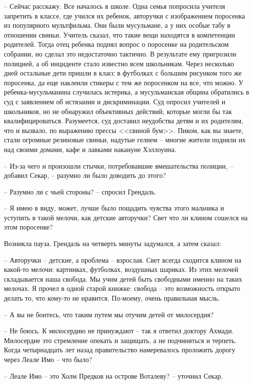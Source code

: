 -- Сейчас расскажу. Все началось в школе. Одна семья попросила учителя запретить в классе, где учился их ребенок, авторучки с изображением поросенка из популярного мультфильма. Они были мусульмане, а у них особые табу в отношении свиньи. Учитель сказал, что такие вещи находятся в компетенции родителей. Тогда отец ребенка поднял вопрос о поросенке на родительском собрании, но сделал это недостаточно тактично. В результате ему пригрозили полицией, а об инциденте стало известно всем школьникам. Через несколько дней остальные дети пришли в класс в футболках с большим рисунком того же поросенка, да еще наклеили стикеры с тем же поросенком на все, что можно. У ребенка-мусульманина случилась истерика, а мусульманская община обратились в суд с заявлением об истязании и дискриминации. Суд опросил учителей и школьников, но не обнаружил объективных действий, которые могли бы так квалифицироваться. Разумеется, суд доставил неудобства детям и их родителям, что и вызвало, по выражению прессы <<свиной бум>>. Пиком, как вы знаете, стали огромные резиновые свиньи, надутые гелием -- многие жители подняли их над своими домами, кафе и лавками накануне Хэллоуина.

-- Из-за чего и произошли стычки, потребовавшие вмешательства полиции, -- добавил Секар, -- разумно ли было доводить до этого?

-- Разумно ли с чьей стороны? -- спросил Грендаль.

-- Я имею в виду, может, лучше было пощадить чувства этого мальчика и уступить в такой мелочи, как детские авторучки? Свет что ли клином сошелся на этом поросенке?

Возникла пауза. Грендаль на четверть минуты задумался, а затем сказал:

-- Авторучки -- детские, а проблема -- взрослая. Свет всегда сходится клином на какой-то мелочи: картинках, футболках, воздушных шариках. Из этих мелочей складывается наша свобода. Мы учим детей быть свободными именно на таких мелочах. Я прочел в одной старой книжке: свобода -- это возможность открыто делать то, что кому-то не нравится. По-моему, очень правильная мысль.

-- А вы не боитесь, что таким путем мы отучим детей от милосердия?

-- Не боюсь. К милосердию не принуждают -- так я ответил доктору Ахмади. Милосердие это стремление опекать и защищать, а не подчиняться и терпеть. Когда четырнадцать лет назад правительство намеревалось проложить дорогу через Леале Имо -- что было?

-- Леале Имо -- это Холм Предков на острове Воталеву? -- уточнил Секар.

